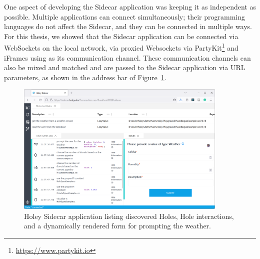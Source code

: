 One aspect of developing the Sidecar application was keeping it as independent as possible.
Multiple applications can connect simultaneously; their programming languages do not affect the Sidecar, and they can be connected in multiple ways.
For this thesis, we showed that the Sidecar application can be connected via WebSockets on the local network, via proxied Websockets via PartyKit\footnote{\url{https://www.partykit.io}} and iFrames using \texttt{} as its communication channel.
These communication channels can also be mixed and matched and are passed to the Sidecar application via URL parameters, as shown in the address bar of Figure~\ref{fig:holey-sidecar}.

\begin{figure}[ht]
    \centering
    \includegraphics[width=0.9\textwidth]{images/sidecar}
    \caption{Holey Sidecar application listing discovered Holes, Hole interactions, and a dynamically rendered form for prompting the weather.}
    \label{fig:holey-sidecar}
\end{figure}